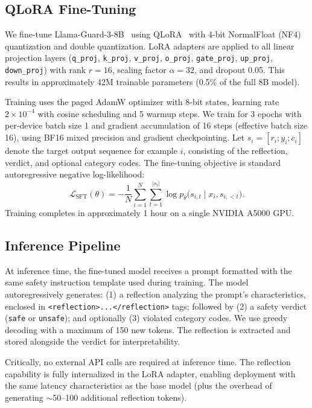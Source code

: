 \documentclass[ai,article,submit,pdftex,moreauthors]{Definitions/mdpi}
\begin{document}
\subsection{QLoRA Fine-Tuning}

We fine-tune Llama-Guard-3-8B~\citep{metallamaguard3} using QLoRA~\citep{dettmers2024qlora} with 4-bit NormalFloat (NF4) quantization and double quantization. LoRA adapters are applied to all linear projection layers (\texttt{q\_proj}, \texttt{k\_proj}, \texttt{v\_proj}, \texttt{o\_proj}, \texttt{gate\_proj}, \texttt{up\_proj}, \texttt{down\_proj}) with rank $r = 16$, scaling factor $\alpha = 32$, and dropout 0.05. This results in approximately 42M trainable parameters (0.5\% of the full 8B model).

Training uses the paged AdamW optimizer with 8-bit states, learning rate $2 \times 10^{-4}$ with cosine scheduling and 5 warmup steps. We train for 3 epochs with per-device batch size 1 and gradient accumulation of 16 steps (effective batch size 16), using BF16 mixed precision and gradient checkpointing. Let $s_i = [r_i; y_i; c_i]$ denote the target output sequence for example $i$, consisting of the reflection, verdict, and optional category codes. The fine-tuning objective is standard autoregressive negative log-likelihood:
\begin{equation}
  \mathcal{L}_{\text{SFT}}(\theta) = - \frac{1}{N} \sum_{i=1}^{N} \sum_{t=1}^{|s_i|}
  \log p_{\theta}\bigl(s_{i,t} \mid x_i, s_{i,<t}\bigr).
\end{equation}
Training completes in approximately 1 hour on a single NVIDIA A5000 GPU.

\subsection{Inference Pipeline}

At inference time, the fine-tuned model receives a prompt formatted with the same safety instruction template used during training. The model autoregressively generates: (1) a reflection analyzing the prompt's characteristics, enclosed in \texttt{<reflection>...</reflection>} tags; followed by (2) a safety verdict (\texttt{safe} or \texttt{unsafe}); and optionally (3) violated category codes. We use greedy decoding with a maximum of 150 new tokens. The reflection is extracted and stored alongside the verdict for interpretability.

Critically, no external API calls are required at inference time. The reflection capability is fully internalized in the LoRA adapter, enabling deployment with the same latency characteristics as the base model (plus the overhead of generating $\sim$50--100 additional reflection tokens).
\end{document}

